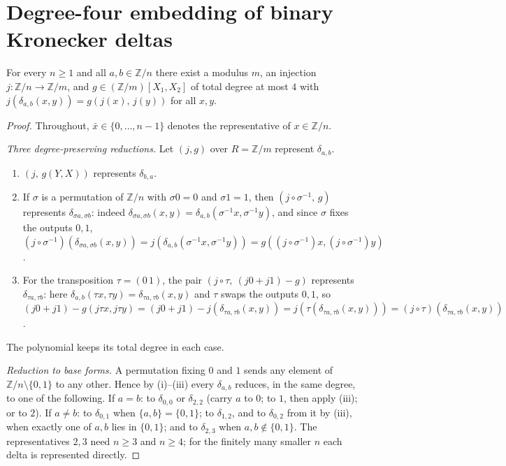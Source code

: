 \section{Degree-four embedding of binary Kronecker deltas}\label{sec:quartic}

\begin{theorem}\label{thm:quartic-rep}
\leanok{}
For every $n \ge 1$ and all $a, b \in \mathbb{Z}/n$ there exist a modulus $m$, an injection
$j \colon \mathbb{Z}/n \to \mathbb{Z}/m$, and $g \in (\mathbb{Z}/m)[X_1,X_2]$ of total
degree at most $4$ with $j(\delta_{a,b}(x,y)) = g(j(x),\, j(y))$ for all $x,y$.
\end{theorem}

\begin{proof}\leanok
Throughout, $\bar x \in \{0,\dots,n-1\}$ denotes the representative of $x \in \mathbb{Z}/n$.

\emph{Three degree-preserving reductions.} Let $(j,g)$ over $R = \mathbb{Z}/m$ represent
$\delta_{a,b}$.
\begin{enumerate}
\item[(i)] $(j,\, g(Y,X))$ represents $\delta_{b,a}$.
\item[(ii)] If $\sigma$ is a permutation of $\mathbb{Z}/n$ with $\sigma 0 = 0$ and
$\sigma 1 = 1$, then $(j \circ \sigma^{-1},\, g)$ represents $\delta_{\sigma a, \sigma b}$:
indeed $\delta_{\sigma a,\sigma b}(x,y) = \delta_{a,b}(\sigma^{-1}x, \sigma^{-1}y)$, and since
$\sigma$ fixes the outputs $0,1$, $(j\circ\sigma^{-1})(\delta_{\sigma a,\sigma b}(x,y)) =
j(\delta_{a,b}(\sigma^{-1}x,\sigma^{-1}y)) = g((j\circ\sigma^{-1})x,(j\circ\sigma^{-1})y)$.
\item[(iii)] For the transposition $\tau = (0\,1)$, the pair
$(j \circ \tau,\ (j 0 + j 1) - g)$ represents $\delta_{\tau a, \tau b}$: here
$\delta_{a,b}(\tau x,\tau y) = \delta_{\tau a,\tau b}(x,y)$ and $\tau$ swaps the outputs
$0,1$, so $(j 0 + j 1) - g(j\tau x, j\tau y) = (j 0 + j 1) - j(\delta_{\tau a,\tau b}(x,y))
= j(\tau(\delta_{\tau a,\tau b}(x,y))) = (j\circ\tau)(\delta_{\tau a,\tau b}(x,y))$.
\end{enumerate}
The polynomial keeps its total degree in each case.

\emph{Reduction to base forms.} A permutation fixing $0$ and $1$ sends any element of
$\mathbb{Z}/n \setminus \{0,1\}$ to any other. Hence by (i)--(iii) every $\delta_{a,b}$
reduces, in the same degree, to one of the following. If $a = b$: to $\delta_{0,0}$ or
$\delta_{2,2}$ (carry $a$ to $0$; to $1$, then apply (iii); or to $2$). If $a \ne b$: to
$\delta_{0,1}$ when $\{a,b\} = \{0,1\}$; to $\delta_{1,2}$, and to $\delta_{0,2}$ from it by
(iii), when exactly one of $a,b$ lies in $\{0,1\}$; and to $\delta_{2,3}$ when
$a,b \notin \{0,1\}$. The representatives $2,3$ need $n \ge 3$ and $n \ge 4$; for the finitely
many smaller $n$ each delta is represented directly.


\end{proof}
